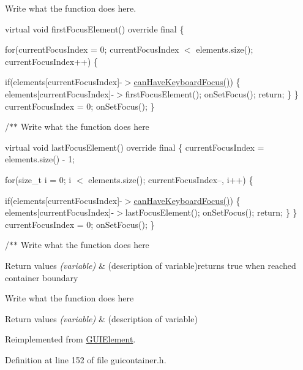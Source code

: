 Write what the function does here. 

virtual void first\+Focus\+Element() override final \{

for(current\+Focus\+Index = 0; current\+Focus\+Index $<$ elements.\+size(); current\+Focus\+Index++) \{

if(elements\mbox{[}current\+Focus\+Index\mbox{]}-\/$>$\hyperlink{classGUIContainer_a54bbf86cc92ce6518ccdc25a21b8e5f5}{can\+Have\+Keyboard\+Focus()}) \{ elements\mbox{[}current\+Focus\+Index\mbox{]}-\/$>$first\+Focus\+Element(); on\+Set\+Focus(); return; \} \} current\+Focus\+Index = 0; on\+Set\+Focus(); \}

/$\ast$$\ast$ Write what the function does here

virtual void last\+Focus\+Element() override final \{ current\+Focus\+Index = elements.\+size() -\/ 1;

for(size\+\_\+t i = 0; i $<$ elements.\+size(); current\+Focus\+Index--, i++) \{

if(elements\mbox{[}current\+Focus\+Index\mbox{]}-\/$>$\hyperlink{classGUIContainer_a54bbf86cc92ce6518ccdc25a21b8e5f5}{can\+Have\+Keyboard\+Focus()}) \{ elements\mbox{[}current\+Focus\+Index\mbox{]}-\/$>$last\+Focus\+Element(); on\+Set\+Focus(); return; \} \} current\+Focus\+Index = 0; on\+Set\+Focus(); \}

/$\ast$$\ast$ Write what the function does here


\begin{DoxyRetVals}{Return values}
{\em (variable)} & (description of variable)returns true when reached container boundary \\
\hline
\end{DoxyRetVals}
Write what the function does here


\begin{DoxyRetVals}{Return values}
{\em (variable)} & (description of variable)\\
\hline
\end{DoxyRetVals}


Reimplemented from \hyperlink{classGUIElement_a970e90bbb7db5de07708b0b2ef53d9e9}{G\+U\+I\+Element}.



Definition at line 152 of file guicontainer.\+h.


